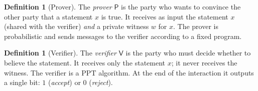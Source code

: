 \documentclass[11pt,a4paper]{report}
\theoremstyle{plain}
\theoremstyle{definition}
\newtheorem{definition}[theorem]{Definition}
\theoremstyle{remark}
\newcommand{\PPT}{\mathrm{PPT}}
\newcommand{\Prv}{\mathsf{P}}\newcommand{\Ver}{\mathsf{V}}
\begin{document}
\begin{definition}[Prover]\label{def:intro-prover}
The \emph{prover} $\Prv$ is the party who wants to convince the other party that a statement $x$ is true. It receives as input the statement $x$ (shared with the verifier) \emph{and} a private witness $w$ for $x$. The prover is probabilistic and sends messages to the verifier according to a fixed program.
\end{definition}

\begin{definition}[Verifier]\label{def:intro-verifier}
The \emph{verifier} $\Ver$ is the party who must decide whether to believe the statement. It receives only the statement $x$; it never receives the witness. The verifier is a $\PPT$ algorithm. At the end of the interaction it outputs a single bit: $1$ (\emph{accept}) or $0$ (\emph{reject}).
\end{definition}
\end{document}
